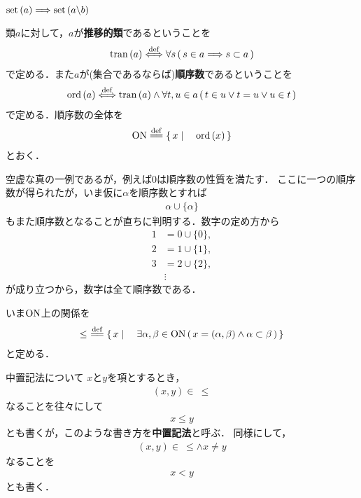 	$\operatorname*{set} \left(a\right) \Longrightarrow \operatorname*{set} \left(a \backslash b\right)$
	
	\begin{screen}
		\begin{dfn}[順序数]
			類$a$に対して，$a$が{\bf 推移的類}であるということを
			\begin{align}
				\operatorname*{tran} \left(a\right) \overset{\mathrm{def}}{\Longleftrightarrow}
				\forall s\, (\, s \in a \Longrightarrow s \subset a\, )
			\end{align}
			で定める．また$a$が(集合であるならば){\bf 順序数}であるということを
			\begin{align}
				\operatorname*{ord} \left(a\right) \overset{\mathrm{def}}{\Longleftrightarrow}
				\operatorname*{tran} \left(a\right) \wedge \forall t,u \in a\, (\, t \in u \vee t = u \vee u \in t\, )
			\end{align}
			で定める．順序数の全体を
			\begin{align}
				\ON \defeq \Set{x}{\ord{x}}
			\end{align}
			とおく．
		\end{dfn}
	\end{screen}
	
	空虚な真の一例であるが，例えば$0$は順序数の性質を満たす．
	ここに一つの順序数が得られたが，いま仮に$\alpha$を順序数とすれば
	\begin{align}
		\alpha \cup \{\alpha\}
	\end{align}
	もまた順序数となることが直ちに判明する．数字の定め方から
	\begin{align}
		1 &= 0 \cup \{0\}, \\
		2 &= 1 \cup \{1\}, \\
		3 &= 2 \cup \{2\}, \\
		&\vdots
	\end{align}
	が成り立つから，数字は全て順序数である．
	
	いま$\mathrm{ON}$上の関係を
	\begin{align}
		\leq\ \defeq \Set{x}{\exists \alpha,\beta \in \ON\, 
		(\, x=(\alpha,\beta) \wedge \alpha \subset \beta\, )}
	\end{align}
	と定める．
		
	\begin{itembox}[l]{中置記法について}
		$x$と$y$を項とするとき，
		\begin{align}
			(x,y) \in\ \leq
		\end{align}
		なることを往々にして
		\begin{align}
			x \leq y
		\end{align}
		とも書くが，このような書き方を{\bf 中置記法}と呼ぶ．
		同様にして，
		\begin{align}
			(x,y) \in\ \leq \wedge x \neq y
		\end{align}
		なることを
		\begin{align}
			x < y
		\end{align}
		とも書く．
	\end{itembox}
	
